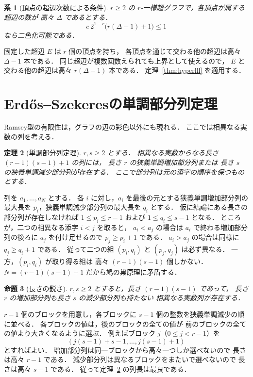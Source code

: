 \documentclass[a5paper,10pt,onecolumn]{jsarticle}
\makeatletter
\theoremstyle{mathnotetheorem}
\newtheorem{theorem}{定理}[section]
\newtheorem{proposition}[theorem]{命題}
\newtheorem{corollary}[theorem]{系}
\renewcommand{\proofname}{証明}
\renewenvironment{proof}[1][\proofname]{%
  \par\pushQED{\qed}\normalfont\topsep4\p@\@plus2\p@\relax
  \trivlist\item[\hskip\labelsep\bfseries #1]\ignorespaces
}{\popQED\endtrivlist\@endpefalse}
\makeatother
\begin{document}
\begin{corollary}[頂点の超辺次数による条件]
$r\ge2$ の $r$-一様超グラフで，各頂点が属する超辺の数が
高々 $\Delta$ であるとする．
\[
 e\,2^{1-r}\bigl(r(\Delta-1)+1\bigr)\le1
\]
なら二色化可能である．
\end{corollary}
\begin{proof}
固定した超辺 $E$ は $r$ 個の頂点を持ち，
各頂点を通じて交わる他の超辺は高々 $\Delta-1$ 本である．
同じ超辺が複数回数えられても上界として使えるので，
$E$ と交わる他の超辺は高々 $r(\Delta-1)$ 本である．
定理~\ref{thm:hyperlll} を適用する．
\end{proof}

\section{Erd\H{o}s--Szekeresの単調部分列定理}
Ramsey型の有限性は，グラフの辺の彩色以外にも現れる．
ここでは相異なる実数の列を考える．

\begin{theorem}[単調部分列定理]\label{thm:erdosszekeres}
$r,s\ge2$ とする．
相異なる実数からなる長さ $(r-1)(s-1)+1$ の列には，
長さ $r$ の狭義単調増加部分列または
長さ $s$ の狭義単調減少部分列が存在する．
ここで部分列は元の添字の順序を保つものとする．
\end{theorem}
\begin{proof}
列を $a_1,\ldots,a_N$ とする．
各 $i$ に対し，$a_i$ を最後の元とする狭義単調増加部分列の
最大長を $p_i$，狭義単調減少部分列の最大長を $q_i$ とする．
仮に結論にある長さの部分列が存在しなければ
$1\le p_i\le r-1$ および $1\le q_i\le s-1$ となる．
ところが，二つの相異なる添字 $i<j$ を取ると，
$a_i<a_j$ の場合は $a_i$ で終わる増加部分列の後ろに
$a_j$ を付け足せるので $p_j\ge p_i+1$ である．
$a_i>a_j$ の場合は同様に $q_j\ge q_i+1$ である．
従って二つの組 $(p_i,q_i)$ と $(p_j,q_j)$ は必ず異なる．
一方，$(p_i,q_i)$ が取り得る組は
高々 $(r-1)(s-1)$ 個しかない．
$N=(r-1)(s-1)+1$ だから鳩の巣原理に矛盾する．
\end{proof}

\begin{proposition}[長さの鋭さ]
$r,s\ge2$ とすると，長さ $(r-1)(s-1)$ であって，
長さ $r$ の増加部分列も長さ $s$ の減少部分列も持たない
相異なる実数列が存在する．
\end{proposition}
\begin{proof}
$r-1$ 個のブロックを用意し，各ブロックに
$s-1$ 個の整数を狭義単調減少の順に並べる．
各ブロックの値は，後のブロックの全ての値が
前のブロックの全ての値より大きくなるように選ぶ．
例えばブロック $j$（$0\le j<r-1$）を
\[
 (j(s-1)+s-1,\ldots,j(s-1)+1)
\]
とすればよい．
増加部分列は同一ブロックから高々一つしか選べないので
長さは高々 $r-1$ である．
減少部分列は異なるブロックをまたいで選べないので
長さは高々 $s-1$ である．
従って定理~\ref{thm:erdosszekeres} の列長は最良である．
\end{proof}
\end{document}
